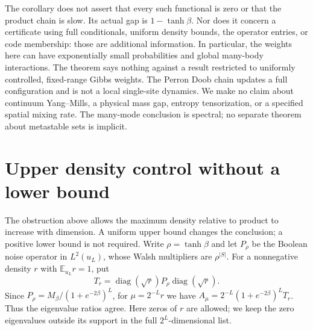 \documentclass[11pt]{article}
\newcommand{\diag}{\operatorname{diag}}
\begin{document}
The corollary does not assert that every such functional is zero or that
the product chain is slow. Its actual gap is $1-\tanh\beta$. Nor does
it concern a certificate using full conditionals, uniform density bounds,
the operator entries, or code membership: those are additional information.
In particular, the weights here can have exponentially small probabilities
and global many-body interactions. The theorem says nothing against a
result restricted to uniformly controlled, fixed-range Gibbs weights.
The Perron Doob chain updates a full configuration and is not a local
single-site dynamics. We make no claim about continuum Yang--Mills,
a physical mass gap, entropy tensorization, or a specified spatial mixing
rate. The many-mode conclusion is spectral; no separate theorem about
metastable sets is implicit.

\section{Upper density control without a lower bound}\label{sec:density}
The obstruction above allows the maximum density relative to product to
increase with dimension. A uniform upper bound changes the conclusion;
a positive lower bound is not required. Write $\rho=\tanh\beta$ and let
$P_\rho$ be the Boolean noise operator in $L^2(u_L)$, whose Walsh
multipliers are $\rho^{|S|}$. For a nonnegative density $r$ with
$\mathbb E_{u_L}r=1$, put
\[
 T_r=\diag(\sqrt r)P_\rho\diag(\sqrt r).
\]
Since $P_\rho=M_\beta/(1+e^{-2\beta})^L$, for $\mu=2^{-L}r$ we have
$A_\mu=2^{-L}(1+e^{-2\beta})^L T_r$. Thus the eigenvalue ratios agree.
Here zeros of $r$ are allowed; we keep the zero eigenvalues outside its
support in the full $2^L$-dimensional list.
\end{document}

